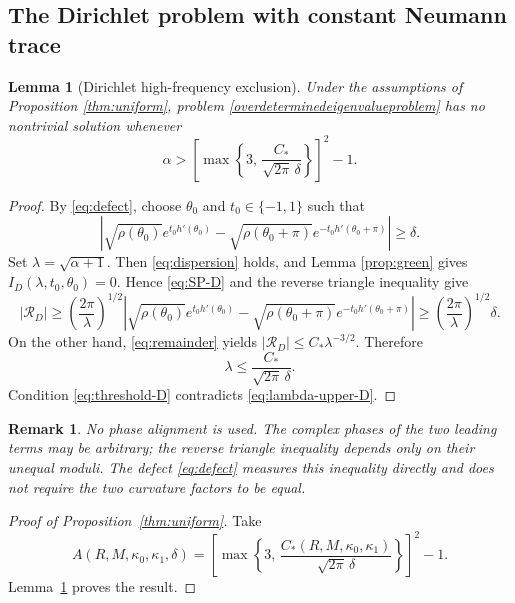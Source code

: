 \documentclass[12pt]{article}
\numberwithin{equation}{section}
\newtheorem{lemma}[theorem]{Lemma}
\newtheorem{remark}[theorem]{Remark}
\numberwithin{equation}{section}
\newcommand{\cR}{\mathcal{R}}
\begin{document}
\subsection{The Dirichlet problem with constant Neumann trace}

\begin{lemma}[Dirichlet high-frequency exclusion]\label{thm:D}
Under the assumptions of Proposition \ref{thm:uniform}, problem \eqref{overdeterminedeigenvalueproblem}
has no nontrivial solution whenever
\begin{equation}\label{eq:threshold-D}
\alpha>
\left[
\max\left\{
3,\,
\frac{C_*}{\sqrt{2\pi}\,\delta}
\right\}
\right]^2-1.
\end{equation}
\end{lemma}

\begin{proof}
By \eqref{eq:defect}, choose $\theta_0$ and $t_0\in\{-1,1\}$ such that
\[
\left|
\sqrt{\rho\left(\theta_0\right)}e^{t_0h'\left(\theta_0\right)}
-\sqrt{\rho\left(\theta_0+\pi\right)}e^{-t_0h'\left(\theta_0+\pi\right)}
\right|\geq\delta.
\]
Set $\lambda=\sqrt{\alpha+1}$. Then \eqref{eq:dispersion} holds, and
Lemma \ref{prop:green} gives
$I_D\left(\lambda,t_0,\theta_0\right)=0$. Hence
\eqref{eq:SP-D} and the reverse triangle inequality give
\[
\left|\cR_D\right|
\ge
\left(\frac{2\pi}{\lambda}\right)^{1/2}
\left|
\sqrt{\rho\left(\theta_0\right)}e^{t_0h'\left(\theta_0\right)}
-\sqrt{\rho\left(\theta_0+\pi\right)}e^{-t_0h'\left(\theta_0+\pi\right)}
\right|
\geq\left(\frac{2\pi}{\lambda}\right)^{1/2}\delta.
\]
On the other hand, \eqref{eq:remainder} yields
$\left|\cR_D\right|\le C_*\lambda^{-3/2}$. Therefore
\begin{equation}\label{eq:lambda-upper-D}
\lambda
\le
\frac{C_*}{\sqrt{2\pi}\,\delta}.
\end{equation}
Condition \eqref{eq:threshold-D} contradicts
\eqref{eq:lambda-upper-D}.
\end{proof}

\begin{remark}
\emph{No phase alignment is used. The complex phases of the two leading terms may
be arbitrary; the reverse triangle inequality depends only on their unequal
moduli. The defect \eqref{eq:defect} measures this inequality directly and
does not require the two curvature factors to be equal.}
\end{remark}

\begin{proof}[Proof of Proposition~\ref{thm:uniform}]
Take
\begin{equation}\label{eq:A-uniform}
A\left(R,M,\kappa_0,\kappa_1,\delta\right)
=
\left[
\max\left\{
3,\,
\frac{C_*\left(R,M,\kappa_0,\kappa_1\right)}
{\sqrt{2\pi}\,\delta}
\right\}
\right]^2-1.
\end{equation}
Lemma~\ref{thm:D} proves the result.
\end{proof}
\end{document}
